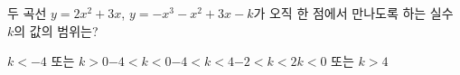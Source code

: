 두 곡선 $y=2x^2+3x$, $y=-x^3-x^2+3x-k$가 오직 한 점에서 만나도록 하는 실수 $k$의 값의 범위는?
\begin{choicesii}{$k<-4$ 또는 $k>0$}{$-4<k<0$}{$-4<k<4$}{$-2<k<2$}{$k<0$ 또는 $k>4$}\end{choicesii}
